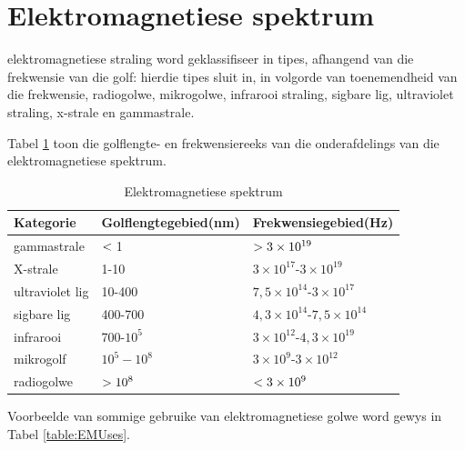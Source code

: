 \section{Elektromagnetiese spektrum}
            \nopagebreak
e\-lek\-tro\-mag\-ne\-tie\-se straling word geklassifiseer in tipes, afhangend van die frekwensie van die golf: hierdie tipes sluit in, in volgorde van toenemendheid van die frekwensie, radiogolwe, mikrogolwe, infrarooi straling, sigbare lig, ultraviolet straling, x-strale en gammastrale. \par 
            \nopagebreak
      


Tabel \ref{table:EMSpectrumRanges} toon die golflengte- en frekwensiereeks van die onderafdelings van die elektromagnetiese spektrum.\par 
          \begin{table}[H]
        \begin{center}
      \label{m38778*uid8}
    \noindent
    
      \begin{tabular}[t]{|l|l|l|}\hline
                \textbf{Kategorie}
               &
                \textbf{Golflengtegebied(nm)}
               &
                \textbf{Frekwensiegebied(Hz)} \\ \hline
        gammastrale &
        $<{}$1 &
                $>{}3\times{10}^{19}$ \\ \hline
        X-strale &
        1-10 &
        $3\ensuremath{\times}{10}^{17}$-$3\ensuremath{\times}{10}^{19}$  \\ \hline
        ultraviolet lig &
        10-400 &
        $7,5\ensuremath{\times}{10}^{14}$-$3\ensuremath{\times}{10}^{17}$ \\ \hline
        sigbare lig &
        400-700 &
        $4,3\ensuremath{\times}{10}^{14}$-$7,5\ensuremath{\times}{10}^{14}$ \\ \hline
        infrarooi &
        700-${10}^{5}$ &
        $3\ensuremath{\times}{10}^{12}$-$4,3\ensuremath{\times}{10}^{19}$ \\ \hline
        mikrogolf &
                ${10}^{5}-{10}^{8}$
               &
        $3\ensuremath{\times}{10}^{9}$-$3\ensuremath{\times}{10}^{12}$ \\ \hline
        radiogolwe &
                $>{}{10}^{8}$
               &
                $<{}3\times{10}^{9}$ \\ \hline
    \end{tabular}
      \end{center}
    \caption{Elektromagnetiese spektrum}
    \label{table:EMSpectrumRanges}
\end{table}
    \par
      \label{m38778*id188548} Voorbeelde van sommige gebruike van elektromagnetiese golwe word gewys in Tabel \ref{table:EMUses}.\par 

